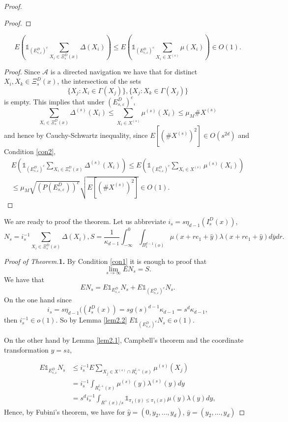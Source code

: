 \begin{proof}
\begin{proof}
 \end{proof}
 \begin{lem}\label{lem2.2} $$E(\mathds{1}_{(E^{D}_{s,\varepsilon})^c}\sum_{X_i\in\Xi_s^D(x)}\Delta(X_i))\leq E(\mathds{1}_{(E^{D}_{s,\varepsilon})^c}\sum_{X_i\in X^{(s)}}\mu(X_i))\in O(1).$$
 \end{lem}
 \begin{proof}
 Since $\mathcal{A}$ is a directed navigation we have that for distinct $X_{i}, X_{k}\in  \Xi^{D}_{s}(x)$, the intersection of the sets $$\lbrace X_j: X_{i} \in \Gamma(X_j)\rbrace, \lbrace X_j: X_{k} \in \Gamma(X_j)\rbrace$$ is empty. This implies that under $(E^{D}_{s,\varepsilon})^c$, $$\sum_{X_i\in \Xi^{D}_{s}(x)}\Delta^{(s)}(X_i)\leq\sum_{X_i\in X^{(s)}}\mu^{(s)}(X_i)\leq \mu_{M}\#X^{(s)} $$ and hence by Cauchy-Schwartz inequality, since $E[(\#X^{(s)})^2]\in O(s^{2d})$ and Condition \ref{con2},
\begin{align*}
E(\mathds{1}_{(E^{D}_{s,\varepsilon})^c}\sum_{X_i\in\Xi_s^D(x)}\Delta^{(s)}(X_i))\leq E(\mathds{1}_{(E^{D}_{s,\varepsilon})^c}\sum_{X_i\in X^{(s)}}\mu^{(s)}(X_i))\\
\leq \mu_M \sqrt{(P(E^D_{s,\varepsilon}))^c}\sqrt{E[(\#X^{(s)})^2]}\in O(1).
\end{align*}

 \end{proof}

We are ready to proof the theorem. Let us abbreviate $i_s=s\eta_{d-1}(I^D_s(x))$, $$N_s=i_s^{-1}\sum_{X_i\in\Xi_s^D(x)}\Delta(X_i), S=\frac{1}{\kappa_{d-1}}\int_{-\infty}^0\int_{B^{d-1}_{1}(o)}\mu(x+re_1+\hat{y})\lambda(x+re_1+\hat{y})d\bar{y}dr.$$
 
 \textit{Proof of Theorem.}\textbf{1.} By Condition \ref{con1} it is enough to proof that $$\lim_{s\rightarrow\infty}EN_s=S.$$ We have that
 $$EN_s=E\mathds{1}_{E^{D}_{s,\varepsilon}}N_s+E\mathds{1}_{(E^{D}_{s,\varepsilon})^c}N_s .$$
 On the one hand since $$i_s=s\eta_{d-1}((I^D_s(x))=sg(s)^{d-1}\kappa_{d-1}=s^{d}\kappa_{d-1},$$ then $i_s^{-1}\in o(1) $. So by Lemma \ref{lem2.2} $E\mathds{1}_{(E^{D}_{s,\varepsilon})^c}N_s\in o(1)$.

On the other hand by Lemma \ref{lem2.1}, Campbell's theorem and the coordinate transformation $y=sz$,

 \begin{align}
 E\mathds{1}_{E^{D}_{s,\varepsilon}}N_s&\leq i_s^{-1}E\sum_{X_j\in X^{(s)}\cap R^{l,+}_{s}(x)}\mu^{(s)}(X_j)\nonumber\\
 &=i_s^{-1}\int_{R^{l,+}_{s}(x)}\mu^{(s)}(y)\lambda^{(s)}(y)dy\nonumber\\
 &=s^{d}i_s^{-1}\int_{R^{+}(x)/s}\mathds{1}_{\pi_1(y)\leq\pi_1(x)}\mu(y)\lambda(y)dy\nonumber,
 \end{align}
Hence, by Fubini's theorem, we have for $\hat{y}=(0, y_2, ...,y_d)$, $\bar{y}=(y_2, ...,y_d)$


\end{proof}

